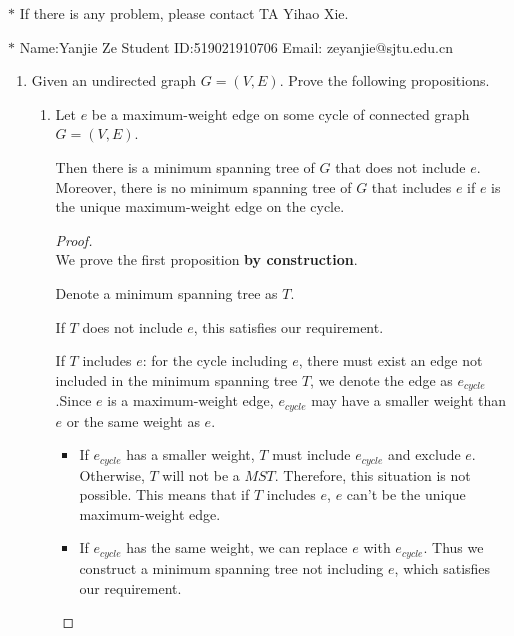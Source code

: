 \documentclass[12pt,a4paper]{article}
\theoremstyle{definition}
\begin{document}
\noindent

\noindent{}
\begin{center}
\footnotesize{\color{red}$*$ If there is any problem, please contact TA Yihao Xie. }

\footnotesize{\color{blue}$*$ Name:Yanjie Ze \quad Student ID:519021910706 \quad Email: zeyanjie@sjtu.edu.cn   }
\end{center}

\begin{enumerate}

	\item Given an undirected graph $G = (V, E)$. Prove the following propositions.
	
		\begin{enumerate}
		\item Let $e$ be a maximum-weight edge on some cycle of connected graph $G=(V,E)$.
		
        Then there is a minimum spanning tree of $G$ that does not include $e$. Moreover, there is no minimum spanning tree of $G$ that includes $e$ if $e$ is the unique maximum-weight edge on the cycle. 
        \begin{proof}
        ~\\
        We prove the first proposition \textbf{by construction}.
        
        Denote a minimum spanning tree as $T$.
        
        If $T$ does not include $e$, this satisfies our requirement.
        
        If $T$ includes $e$: for the cycle including $e$, there must exist an edge not included in the minimum spanning tree $T$, we denote the edge as $e_{cycle}$.Since $e$ is a maximum-weight edge, $e_{cycle}$ may have a smaller weight than $e$ or the same weight as $e$. 
        \begin{itemize}
            \item 
        If $e_{cycle}$ has a smaller weight, $T$ must include $e_{cycle}$ and exclude $e$. Otherwise, $T$ will not be a $MST$. Therefore, this situation is not possible. This means that if $T$ includes $e$, $e$ can't  be the unique maximum-weight edge.
         \item 
        If $e_{cycle}$ has the same weight, we can replace $e$ with $e_{cycle}$. Thus we construct a minimum spanning tree not including $e$, which satisfies our requirement.
      \end{itemize}
      

\end{proof}
\end{enumerate}
\end{enumerate}
\end{document}
